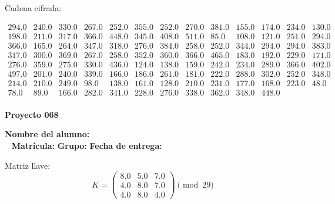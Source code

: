 \documentclass[12pt]{article}
\begin{document}
Cadena cifrada:
\begin{center}
$\begin{array}{lllllllllllll}
294.0 & 240.0 & 330.0 & 267.0 & 252.0 & 355.0 & 252.0 & 270.0 & 381.0 & 155.0 & 174.0 & 234.0 & 130.0\\
198.0 & 211.0 & 317.0 & 366.0 & 448.0 & 345.0 & 408.0 & 511.0 & 85.0 & 108.0 & 121.0 & 251.0 & 294.0\\
366.0 & 165.0 & 264.0 & 347.0 & 318.0 & 276.0 & 384.0 & 258.0 & 252.0 & 344.0 & 294.0 & 294.0 & 383.0\\
317.0 & 300.0 & 369.0 & 267.0 & 258.0 & 352.0 & 360.0 & 366.0 & 465.0 & 183.0 & 192.0 & 229.0 & 171.0\\
276.0 & 359.0 & 275.0 & 330.0 & 436.0 & 124.0 & 138.0 & 159.0 & 242.0 & 234.0 & 289.0 & 366.0 & 402.0\\
497.0 & 201.0 & 240.0 & 339.0 & 166.0 & 186.0 & 261.0 & 181.0 & 222.0 & 288.0 & 302.0 & 252.0 & 348.0\\
214.0 & 210.0 & 249.0 & 98.0 & 138.0 & 161.0 & 128.0 & 210.0 & 231.0 & 177.0 & 168.0 & 223.0 & 48.0\\
78.0 & 89.0 & 166.0 & 282.0 & 341.0 & 228.0 & 276.0 & 338.0 & 362.0 & 348.0 & 448.0\\
\end{array}$
\end{center}

\newpage


\textbf{Proyecto 068}

\textbf{Nombre del alumno:} \underline{\hspace{13cm}}\\\
\vspace{1cm}
\textbf{Matrícula:} \underline{\hspace{4cm}} \hspace{1cm}
\textbf{Grupo:} \underline{\hspace{2cm}}
\textbf{Fecha de entrega:} \underline{\hspace{2cm}}

\medskip

Matriz llave:
\[
K = \begin{pmatrix}
8.0 & 5.0 & 7.0\\
4.0 & 8.0 & 7.0\\
4.0 & 8.0 & 4.0
\end{pmatrix} \pmod{29}
\]
\end{document}
